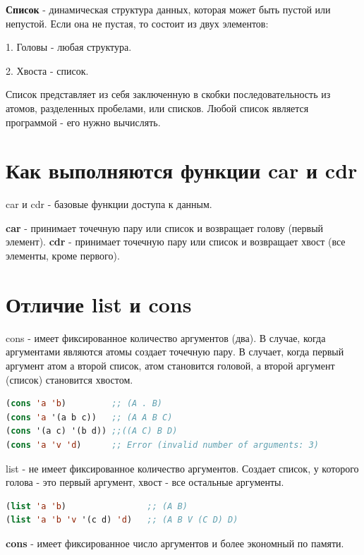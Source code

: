 \textbf{Список} - динамическая структура данных, которая может быть
пустой или непустой. Если она не пустая, то состоит из двух элементов:

1. Головы - любая структура.

2. Хвоста - список.

Список представляет из себя заключенную в скобки
последовательность из атомов, разделенных пробелами, или списков.
Любой список является программой - его нужно вычислять.

\section{Как выполняются функции car и cdr}

car и cdr - базовые функции доступа к данным. 

\textbf{car} - принимает точечную пару или список и возвращает голову (первый элемент).
\textbf{cdr} - принимает точечную пару или список и возвращает хвост (все элементы, кроме первого).

\section{Отличие list и cons}

cons - имеет фиксированное количество аргументов (два). 
В случае, когда аргументами являются атомы создает точечную пару.
В случает, когда первый аргумент атом а второй список, атом становится головой,
а второй аргумент (список) становится хвостом. 
\begin{lstlisting}[language=Lisp]
(cons 'a 'b) 		 ;; (A . B)
(cons 'a '(a b c)) 	 ;; (A A B C)
(cons '(a c) '(b d)) ;;((A C) B D)
(cons 'a 'v 'd)  	 ;; Error (invalid number of arguments: 3)
\end{lstlisting}

\begin{figure}[ht!]
\end{figure}

list - не имеет фиксированное количество аргументов. 
Создает список, у которого голова - это первый аргумент,
хвост - все остальные аргументы.
\begin{lstlisting}[language=Lisp]
(list 'a 'b) 				;; (A B)
(list 'a 'b 'v '(c d) 'd) 	;; (A B V (C D) D)
\end{lstlisting}

\begin{figure}[ht!]
\end{figure}

\textbf{cons} - имеет фиксированное число аргументов и более экономный по памяти.

